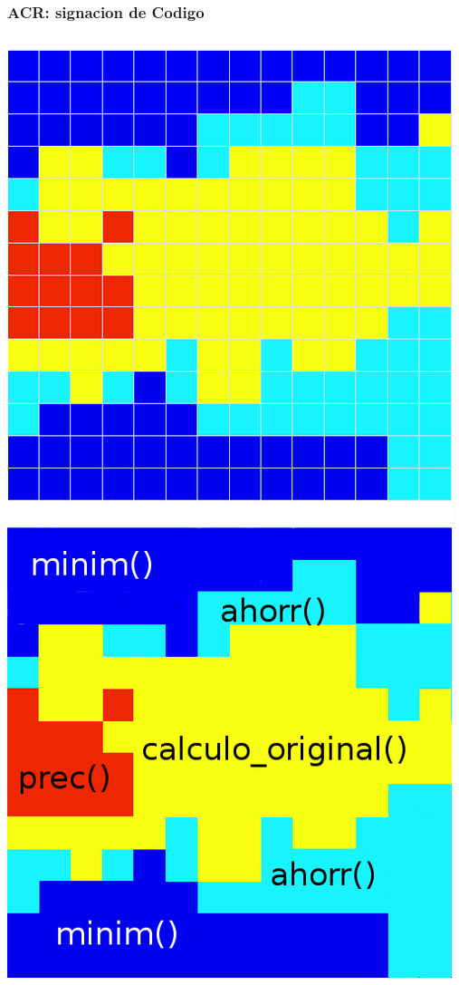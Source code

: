 \documentclass{beamer}\usetheme{Madrid} %
\begin{document}
\begin{frame}[fragile]
\frametitle{ACR: signacion de Codigo}
\begin{columns}
\begin{center}
\includegraphics[scale=0.2]{img/asignacion_codigo.png}

\end{center}
\end{columns}
\end{frame}
\end{document}
